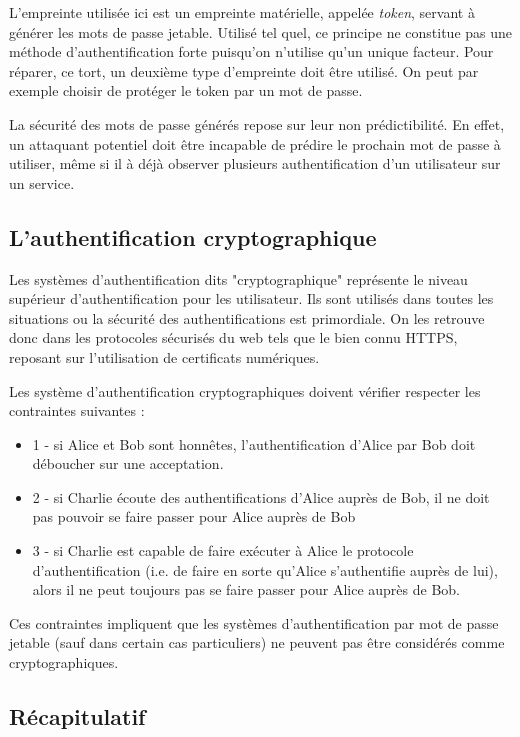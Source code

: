	L'empreinte utilisée ici est un empreinte matérielle, appelée \emph{token}, servant à
	générer les mots de passe jetable. Utilisé tel quel, ce principe ne constitue pas une
	méthode d'authentification forte puisqu'on n'utilise qu'un unique facteur. Pour réparer,
	ce tort, un deuxième type d'empreinte doit être utilisé. On peut par exemple choisir de
	protéger le token par un mot de passe.
	
	La sécurité des mots de passe générés repose sur leur non prédictibilité. En effet,
	un attaquant potentiel doit être incapable de prédire le prochain mot de passe à
	utiliser, même si il à déjà observer plusieurs authentification d'un utilisateur sur 
	un service.

\subsection{L'authentification cryptographique}

	Les systèmes d'authentification dits "cryptographique" représente le niveau supérieur
	d'authentification pour les utilisateur. Ils sont utilisés dans toutes les situations
	ou la sécurité des authentifications est primordiale. On les retrouve donc dans les 
	protocoles sécurisés du web tels que le bien connu HTTPS, reposant sur l'utilisation de
	certificats numériques.
	
	Les système d'authentification cryptographiques doivent vérifier respecter les
	contraintes suivantes \cite{Auth} :
	\begin{itemize}
	  \item 1 - si Alice et Bob sont honnêtes, l'authentification d'Alice par Bob doit
	  déboucher sur une acceptation.
	  \item 2 - si Charlie écoute des authentifications d'Alice auprès de Bob, il ne doit
	  pas pouvoir se faire passer pour Alice auprès de Bob
	  \item 3 - si Charlie est capable de faire exécuter à Alice le protocole 
	  d'authentification (i.e. de faire en sorte qu'Alice s'authentifie auprès de lui),
	  alors il ne peut toujours pas se faire passer pour Alice auprès de Bob.
	\end{itemize}

  Ces contraintes impliquent que les systèmes d'authentification par mot de passe jetable
  (sauf dans certain cas particuliers) ne peuvent pas être considérés comme
  cryptographiques. 
  
  
\subsection{Récapitulatif}

